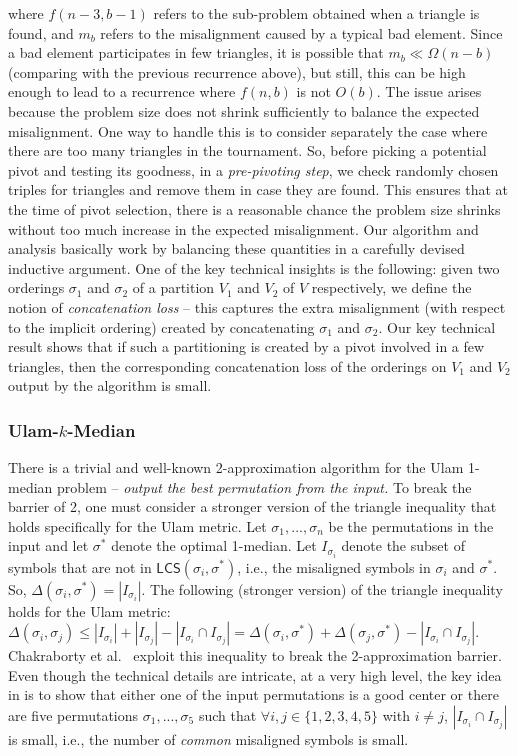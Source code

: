 \documentclass[11pt]{llncs}
\newcommand{\LCS}{{\textsf{LCS}}}
\begin{document}
where $f(n-3,b-1)$ refers to the sub-problem obtained when a triangle is found, and $m_b$ refers to the misalignment caused by a typical bad element. Since a bad element participates in few triangles, it is possible that $m_b \ll \Omega(n-b)$ (comparing with the previous recurrence above), but still, this can be high enough to lead to a recurrence where $f(n,b)$ is not $O(b)$. The issue arises because the problem size does not shrink sufficiently to balance the expected misalignment. One way to handle this is to consider separately the case where there are too many triangles in the tournament. So, before picking a potential pivot and testing its goodness, in a {\em pre-pivoting step}, we check randomly chosen triples for triangles and remove them in case they are found. This ensures that at the time of pivot selection, there is a reasonable chance the problem size shrinks without too much increase in the expected misalignment. Our algorithm and analysis basically work by balancing these quantities in a carefully devised inductive argument. One of the key technical insights is the following: given two orderings $\sigma_1$ and $\sigma_2$ of a partition $V_1$ and $V_2$ of $V$ respectively, we define the notion of {\em concatenation loss} -- this captures the extra misalignment (with respect to the implicit ordering) created by concatenating $\sigma_1$ and $\sigma_2$. Our key technical result shows that if such a partitioning is created by a pivot involved in a few triangles, then the corresponding concatenation loss of the orderings on $V_1$ and $V_2$ output by the algorithm is small.




\subsubsection{Ulam-$k$-Median}
There is a trivial and well-known 2-approximation algorithm for the Ulam 1-median problem -- {\it output the best permutation from the input.}  To break the barrier of 2, one must consider a stronger version of the triangle inequality that holds specifically for the Ulam metric. Let $\sigma_1, ..., \sigma_n$ be the permutations in the input and let $\sigma^*$ denote the optimal 1-median. Let $I_{\sigma_i}$ denote the subset of symbols that are not in $\LCS(\sigma_i, \sigma^*)$, i.e., the misaligned symbols in $\sigma_i$ and $\sigma^*$. So, $\Delta(\sigma_i, \sigma^*) = |I_{\sigma_i}|$. The following (stronger version) of the triangle inequality holds for the Ulam metric: $\Delta(\sigma_i, \sigma_j) \leq |I_{\sigma_i}| + |I_{\sigma_j}| - |I_{\sigma_i} \cap I_{\sigma_j}| = \Delta(\sigma_i, \sigma^*) + \Delta(\sigma_j, \sigma^*) - |I_{\sigma_i} \cap I_{\sigma_j}|$. Chakraborty et al.~\cite{cdk23} exploit this inequality to break the 2-approximation barrier. 
Even though the technical details are intricate, at a very high level, the key idea in \cite{cdk23} is to show that either one of the input permutations is a good center or there are five permutations $\sigma_1, ..., \sigma_5$ such that $\forall i, j \in \{1,2,3,4,5\}$ with $i \neq j$, $|I_{\sigma_i} \cap I_{\sigma_j}|$ is small, i.e., the number of {\em common} misaligned symbols is small.
\end{document}
